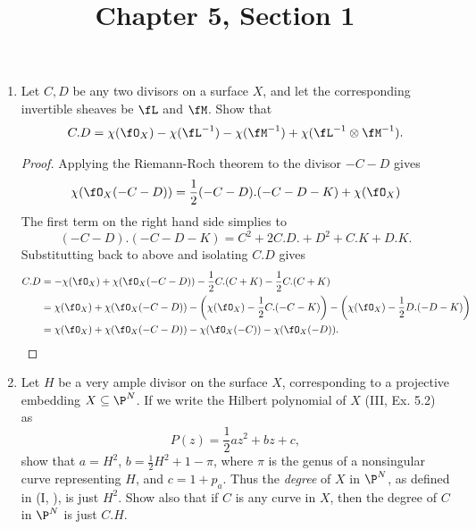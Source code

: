 \documentclass[a4paper]{article}
\title{Chapter 5, Section 1}
\begin{document}
\maketitle

\begin{enumerate} [label=\textbf{\arabic*.}, leftmargin=0em]


    \item Let $C, D$ be any two divisors on a surface $X$, and let the corresponding invertible sheaves be $\fL$ and $\fM$.
          Show that
          \begin{equation*}
              C.D = \chi(\fO_X) - \chi(\fL^{-1}) - \chi(\fM^{-1}) + \chi(\fL^{-1} \otimes \fM^{-1}).
          \end{equation*}

          \begin{proof}
              Applying the Riemann-Roch theorem to the divisor $-C - D$ gives
              \begin{equation*}
                  \chi(\fO_X(-C - D)) = \frac{1}{2}(-C - D).(-C - D - K) + \chi(\fO_X)
              \end{equation*}
              The first term on the right hand side simplies to
              \begin{equation*}
                  (-C - D).(-C - D - K) = C^2 + 2C.D. + D^2 + C.K + D.K.
              \end{equation*}
              Substitutting back to above and isolating $C.D$ gives
              \begin{align*}
                  C.D & = -\chi(\fO_X) + \chi(\fO_X(-C - D)) - \frac{1}{2}C.(C + K) - \frac{1}{2}C.(C + K)                                                   \\
                      & = \chi(\fO_X) + \chi(\fO_X(-C - D)) - \bigg(\chi(\fO_X) - \frac{1}{2}C.(-C-K) \bigg) - \bigg(\chi(\fO_X) -\frac{1}{2}D.(-D -K)\bigg) \\
                      & = \chi(\fO_X) + \chi(\fO_X(-C-D)) - \chi(\fO_X(-C)) - \chi(\fO_X(-D)).
              \end{align*}
          \end{proof}

    \item Let $H$ be a very ample divisor on the surface $X$, corresponding to a projective embedding $X \subseteq \P^N$.
          If we write the Hilbert polynomial of $X$ (III, Ex. 5.2) as
          \begin{equation*}
              P(z) = \frac{1}{2}az^2 + bz + c,
          \end{equation*}
          show that $a = H^2$, $b = \frac{1}{2}H^2 + 1 - \pi$, where $\pi$ is the genus of a nonsingular curve representing $H$, and $c = 1 + p_a$.
          Thus the \textit{degree} of $X$ in $\P^N$, as defined in (I,  ), is just $H^2$.
          Show also that if $C$ is any curve in $X$, then the degree of $C$ in $\P^N$ is just $C.H$.


\end{enumerate}
\end{document}
